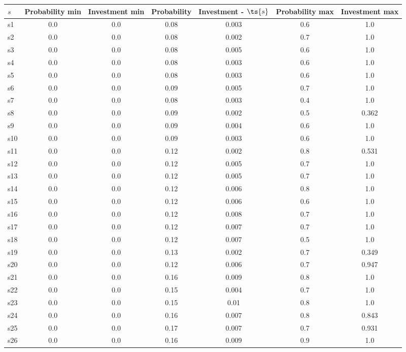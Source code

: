 \documentclass{article}
\begin{document}
\noindent\begin{tabular}{|l|c|c|c|c|c|c|}
\hline
$s$& Probability min & Investment min & Probability & Investment - $\ts{s}$ & Probability max & Investment max\\
\hline
s1 &0.0 & 0.0 & 0.08 & 0.003 & 0.6 & 1.0\\
\hline
s2 &0.0 & 0.0 & 0.08 & 0.002 & 0.7 & 1.0\\
\hline
s3 &0.0 & 0.0 & 0.08 & 0.005 & 0.6 & 1.0\\
\hline
s4 &0.0 & 0.0 & 0.08 & 0.003 & 0.6 & 1.0\\
\hline
s5 &0.0 & 0.0 & 0.08 & 0.003 & 0.6 & 1.0\\
\hline
s6 &0.0 & 0.0 & 0.09 & 0.005 & 0.7 & 1.0\\
\hline
s7 &0.0 & 0.0 & 0.08 & 0.003 & 0.4 & 1.0\\
\hline
s8 &0.0 & 0.0 & 0.09 & 0.002 & 0.5 & 0.362\\
\hline
s9 &0.0 & 0.0 & 0.09 & 0.004 & 0.6 & 1.0\\
\hline
s10 &0.0 & 0.0 & 0.09 & 0.003 & 0.6 & 1.0\\
\hline
s11 &0.0 & 0.0 & 0.12 & 0.002 & 0.8 & 0.531\\
\hline
s12 &0.0 & 0.0 & 0.12 & 0.005 & 0.7 & 1.0\\
\hline
s13 &0.0 & 0.0 & 0.12 & 0.005 & 0.7 & 1.0\\
\hline
s14 &0.0 & 0.0 & 0.12 & 0.006 & 0.8 & 1.0\\
\hline
s15 &0.0 & 0.0 & 0.12 & 0.006 & 0.6 & 1.0\\
\hline
s16 &0.0 & 0.0 & 0.12 & 0.008 & 0.7 & 1.0\\
\hline
s17 &0.0 & 0.0 & 0.12 & 0.007 & 0.7 & 1.0\\
\hline
s18 &0.0 & 0.0 & 0.12 & 0.007 & 0.5 & 1.0\\
\hline
s19 &0.0 & 0.0 & 0.13 & 0.002 & 0.7 & 0.349\\
\hline
s20 &0.0 & 0.0 & 0.12 & 0.006 & 0.7 & 0.947\\
\hline
s21 &0.0 & 0.0 & 0.16 & 0.009 & 0.8 & 1.0\\
\hline
s22 &0.0 & 0.0 & 0.15 & 0.004 & 0.7 & 1.0\\
\hline
s23 &0.0 & 0.0 & 0.15 & 0.01 & 0.8 & 1.0\\
\hline
s24 &0.0 & 0.0 & 0.16 & 0.007 & 0.8 & 0.843\\
\hline
s25 &0.0 & 0.0 & 0.17 & 0.007 & 0.7 & 0.931\\
\hline
s26 &0.0 & 0.0 & 0.16 & 0.009 & 0.9 & 1.0\\

\end{tabular}
\end{document}
